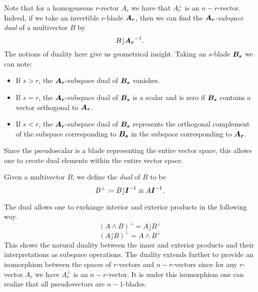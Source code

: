 Note that for a homogeneous $r$-rector $A_r$ we have that $A_r^\perp$ is an $n-r$-vector. Indeed, if we take an invertible $r$-blade $\boldsymbol{A_r}$, then we can find the \emph{$\boldsymbol{A_r}$-subspace dual} of a multivector $B$ by
\[
B \rfloor \boldsymbol{A_r}^{-1}.
\]
The notions of duality here give us geometrical insight. Taking an $s$-blade $\boldsymbol{B_s}$ we can note:
\begin{itemize}
    \item If $s>r$, the $\boldsymbol{A_r}$-subspace dual of $\boldsymbol{B_s}$ vanishes.
    \item If $s=r$, the $\boldsymbol{A_r}$-subspace dual of $\boldsymbol{B_s}$ is a scalar and is zero if $\boldsymbol{B_s}$ contains a vector orthogonal to $\boldsymbol{A_r}$.
    \item If $s<r$, the $\boldsymbol{A_r}$-subspace dual of $\boldsymbol{B_s}$ represents the orthogonal complement of the subspace corresponding to $\boldsymbol{B_s}$ in the subspace corresponding to $\boldsymbol{A_r}$.
\end{itemize}  
Since the pseudoscalar is a blade representing the entire vector space, this allows one to create dual elements within the entire vector space. 
\begin{definition}
Given a multivector $B$, we define the \emph{dual} of $B$ to be
\begin{equation}
B^\perp \coloneqq B \rfloor \boldsymbol{I}^{-1} \equiv A\boldsymbol{I}^{-1}.
\end{equation}
\end{definition}
The dual allows one to exchange interior and exterior products in the following way.
\begin{equation}
\label{eq:wedge_to_dot}
 (A \wedge B)^\perp  = A\rfloor B^\perp
\end{equation}
\begin{equation}
\label{eq:dot_to_wedge}
    (A\rfloor B)^\perp = A \wedge B^\perp
\end{equation}
This shows the natural duality between the inner and exterior products and their interpretations as subspace operations. The duality extends further to provide an isomorphism between the spaces of $r$-vectors and $n-r$-vectors since for any $r$-vector $A_r$ we have $A_r^\perp$ is an $n-r$-vector. It is under this isomorphism one can realize that all pseudovectors are $n-1$-blades. 

